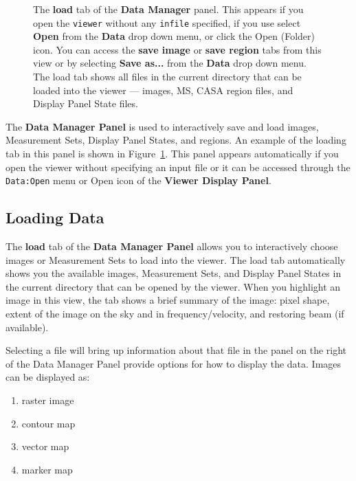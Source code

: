 \begin{figure}[h!]
\begin{center}
\caption{\label{fig:viewer_load} The {\bf load} tab of the {\bf Data Manager} panel.
This appears if you open the {\tt viewer} without any {\tt infile} 
specified, if you use select {\bf Open} from the {\bf Data} drop down menu, or click the
Open (Folder) icon. You can access the {\bf save image} or {\bf save region} tabs
from this view or by selecting {\bf Save as...} from the {\bf Data} drop down menu.
The load tab shows all files in the current directory that can be loaded into the viewer 
--- images, MS, CASA region files, and Display Panel State files.}
\end{center}
\hrulefill
\end{figure}

The {\bf Data Manager Panel} is used to interactively save  and load
images, Measurement Sets, Display Panel States, and regions. An 
example of the loading tab in this panel is shown in Figure~\ref{fig:viewer_load}.  This
panel appears automatically if you open the viewer without specifying
an input file or it can be accessed through the {\tt Data:Open} menu or Open icon
of the {\bf Viewer Display Panel}.

\subsection{Loading Data}
\label{section:display.dataManager.load}

The {\bf load} tab of the {\bf Data Manager Panel} allows you to interactively
choose images or Measurement Sets to load into the viewer. The load tab
automatically shows you the available images, Measurement Sets, and
Display Panel States in the current directory that can be opened by the viewer.
When you highlight an image in this view, the tab shows a brief summary of
the image: pixel shape, extent of the image on the sky and in frequency/velocity, and 
restoring beam (if available).

Selecting a file will bring up information about that file in the panel on the right of the
Data Manager Panel provide options for how to display the data. Images can be displayed as: 

\begin{enumerate}
\item raster image 
\item contour map 
\item vector map
\item marker map  
\end{enumerate}

